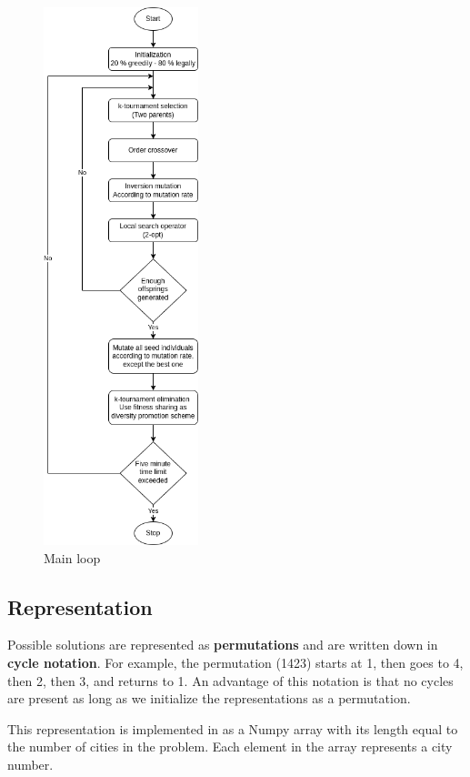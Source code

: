 \documentclass[a4paper,10pt]{article}
\begin{document}
\begin{figure}[H]
\caption{Main loop}
\label{main_loop}
\centering
\hspace*{-3.10cm}
\includegraphics[width=0.4\textwidth]{flowchart.png}
\end{figure}

\clearpage
\subsection{Representation}
Possible solutions are represented as \textbf{permutations} and are written down in \textbf{cycle notation}. For example, the permutation (1423) starts at 1, then goes to 4, then 2, then 3, and returns to 1. An advantage of this notation is that no cycles are present as long as we initialize the representations as a permutation. 

This representation is implemented in as a Numpy array with its length equal to the number of cities in the problem. Each element in the array represents a city number.
\end{document}
